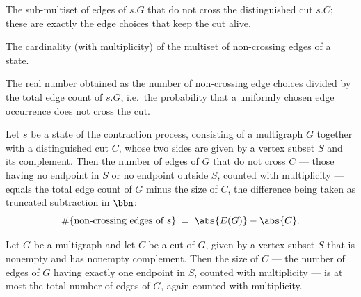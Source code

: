 \begin{definition}
\label{KargerTrace.nonCrossingEdges}
\leanok
{}
The sub-multiset of edges of $s.G$ that do not cross the distinguished cut $s.C$; these
are exactly the edge choices that keep the cut alive.
\end{definition}

\begin{definition}
\label{KargerTrace.nonCrossingChoiceCount}
\leanok
{}
The cardinality (with multiplicity) of the multiset of non-crossing edges of a state.
\end{definition}

\begin{definition}
\label{KargerTrace.uniformSurvivalProb}
\leanok
{}
The real number obtained as the number of non-crossing edge choices divided by the total
edge count of $s.G$, i.e.\ the probability that a uniformly chosen edge occurrence does not
cross the cut.
\end{definition}

\begin{lemma}
\label{KargerTrace.nonCrossingChoiceCount_eq_edgeCount_sub_cutSize}
\leanok
{}
Let $s$ be a state of the contraction process, consisting of a multigraph $G$ together
with a distinguished cut $C$, whose two sides are given by a vertex subset $S$ and its
complement. Then the number of edges of $G$ that do not cross $C$ — those having no
endpoint in $S$ or no endpoint outside $S$, counted with multiplicity — equals the total
edge count of $G$ minus the size of $C$, the difference being taken as truncated
subtraction in $\bbn$:
\[
\#\{\text{non-crossing edges of }s\} \;=\; \abs{E(G)} - \abs{C}.
\]
\end{lemma}

\begin{lemma}
\label{KargerTrace.cut_size_le_edgeCount}
\leanok
{}
Let $G$ be a multigraph and let $C$ be a cut of $G$, given by a vertex subset $S$ that
is nonempty and has nonempty complement. Then the size of $C$ — the number of edges of
$G$ having exactly one endpoint in $S$, counted with multiplicity — is at most the total
number of edges of $G$, again counted with multiplicity.
\end{lemma}

